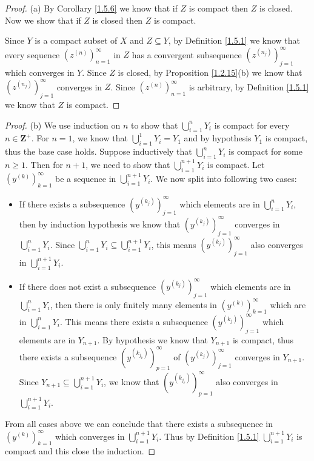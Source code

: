 \begin{proof}{(a)}
    By Corollary \ref{1.5.6} we know that if \(Z\) is compact then \(Z\) is closed.
    Now we show that if \(Z\) is closed then \(Z\) is compact.

    Since \(Y\) is a compact subset of \(X\) and \(Z \subseteq Y\), by Definition \ref{1.5.1} we know that every sequence \((z^{(n)})_{n = 1}^\infty\) in \(Z\) has a convergent subsequence \((z^{(n_j)})_{j = 1}^\infty\) which converges in \(Y\).
    Since \(Z\) is closed, by Proposition \ref{1.2.15}(b) we know that \((z^{(n_j)})_{j = 1}^\infty\) converges in \(Z\).
    Since \((z^{(n)})_{n = 1}^\infty\) is arbitrary, by Definition \ref{1.5.1} we know that \(Z\) is compact.
\end{proof}

\begin{proof}{(b)}
    We use induction on \(n\) to show that \(\bigcup_{i = 1}^n Y_i\) is compact for every \(n \in \mathbf{Z}^+\).
    For \(n = 1\), we know that \(\bigcup_{i = 1}^1 Y_i = Y_1\) and by hypothesis \(Y_1\) is compact, thus the base case holds.
    Suppose inductively that \(\bigcup_{i = 1}^n Y_i\) is compact for some \(n \geq 1\).
    Then for \(n + 1\), we need to show that \(\bigcup_{i = 1}^{n + 1} Y_i\) is compact.
    Let \((y^{(k)})_{k = 1}^\infty\) be a sequence in \(\bigcup_{i = 1}^{n + 1} Y_i\).
    We now split into following two cases:
    \begin{itemize}
        \item If there exists a subsequence \((y^{(k_j)})_{j = 1}^\infty\) which elements are in \(\bigcup_{i = 1}^n Y_i\), then by induction hypothesis we know that \((y^{(k_j)})_{j = 1}^\infty\) converges in \(\bigcup_{i = 1}^n Y_i\).
              Since \(\bigcup_{i = 1}^n Y_i \subseteq \bigcup_{i = 1}^{n + 1} Y_i\), this means \((y^{(k_j)})_{j = 1}^\infty\) also converges in \(\bigcup_{i = 1}^{n + 1} Y_i\).
        \item If there does not exist a subsequence \((y^{(k_j)})_{j = 1}^\infty\) which elements are in \(\bigcup_{i = 1}^n Y_i\), then there is only finitely many elements in \((y^{(k)})_{k = 1}^\infty\) which are in \(\bigcup_{i = 1}^n Y_i\).
              This means there exists a subsequence \((y^{(k_j)})_{j = 1}^\infty\) which elements are in \(Y_{n + 1}\).
              By hypothesis we know that \(Y_{n + 1}\) is compact, thus there exists a subsequence \((y^{(k_{j_p})})_{p = 1}^\infty\) of \((y^{(k_j)})_{j = 1}^\infty\) converges in \(Y_{n + 1}\).
              Since \(Y_{n + 1} \subseteq \bigcup_{i = 1}^{n + 1} Y_i\), we know that \((y^{(k_{j_p})})_{p = 1}^\infty\) also converges in \(\bigcup_{i = 1}^{n + 1} Y_i\).
    \end{itemize}
    From all cases above we can conclude that there exists a subsequence in \((y^{(k)})_{k = 1}^\infty\) which converges in \(\bigcup_{i = 1}^{n + 1} Y_i\).
    Thus by Definition \ref{1.5.1} \(\bigcup_{i = 1}^{n + 1} Y_i\) is compact and this close the induction.
\end{proof}